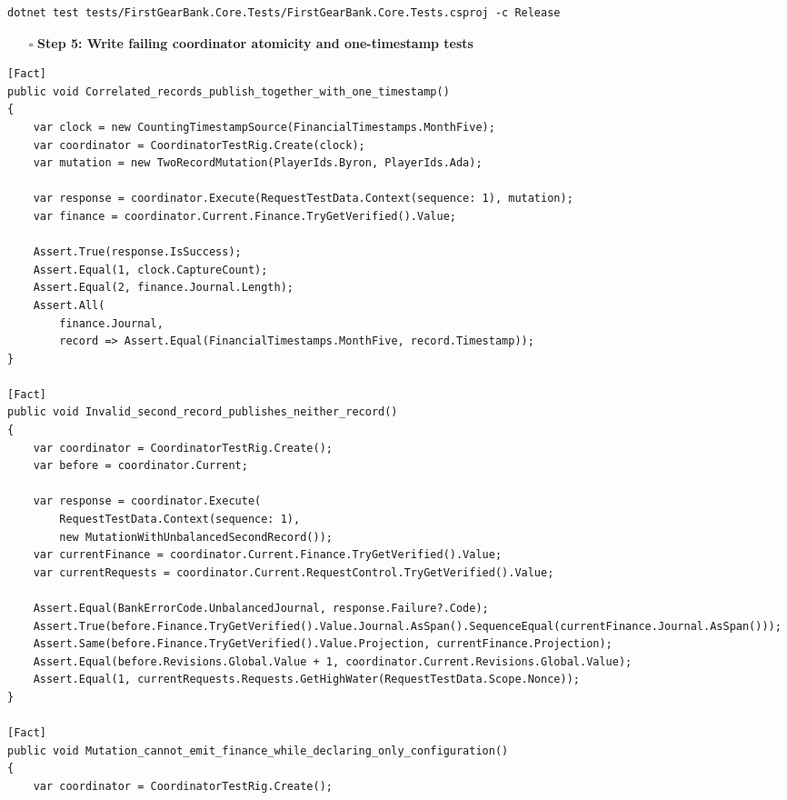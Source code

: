 \documentclass[
  10pt,
  letterpaper,
]{article}
\providecommand{\tightlist}{%
  \setlength{\itemsep}{0pt}\setlength{\parskip}{0pt}}
\begin{document}
\begin{lstlisting}
dotnet test tests/FirstGearBank.Core.Tests/FirstGearBank.Core.Tests.csproj -c Release
\end{lstlisting}

\begin{itemize}
\tightlist
\item[$\square$]
  \textbf{Step 5: Write failing coordinator atomicity and one-timestamp
  tests}
\end{itemize}

\begin{lstlisting}
[Fact]
public void Correlated_records_publish_together_with_one_timestamp()
{
    var clock = new CountingTimestampSource(FinancialTimestamps.MonthFive);
    var coordinator = CoordinatorTestRig.Create(clock);
    var mutation = new TwoRecordMutation(PlayerIds.Byron, PlayerIds.Ada);

    var response = coordinator.Execute(RequestTestData.Context(sequence: 1), mutation);
    var finance = coordinator.Current.Finance.TryGetVerified().Value;

    Assert.True(response.IsSuccess);
    Assert.Equal(1, clock.CaptureCount);
    Assert.Equal(2, finance.Journal.Length);
    Assert.All(
        finance.Journal,
        record => Assert.Equal(FinancialTimestamps.MonthFive, record.Timestamp));
}

[Fact]
public void Invalid_second_record_publishes_neither_record()
{
    var coordinator = CoordinatorTestRig.Create();
    var before = coordinator.Current;

    var response = coordinator.Execute(
        RequestTestData.Context(sequence: 1),
        new MutationWithUnbalancedSecondRecord());
    var currentFinance = coordinator.Current.Finance.TryGetVerified().Value;
    var currentRequests = coordinator.Current.RequestControl.TryGetVerified().Value;

    Assert.Equal(BankErrorCode.UnbalancedJournal, response.Failure?.Code);
    Assert.True(before.Finance.TryGetVerified().Value.Journal.AsSpan().SequenceEqual(currentFinance.Journal.AsSpan()));
    Assert.Same(before.Finance.TryGetVerified().Value.Projection, currentFinance.Projection);
    Assert.Equal(before.Revisions.Global.Value + 1, coordinator.Current.Revisions.Global.Value);
    Assert.Equal(1, currentRequests.Requests.GetHighWater(RequestTestData.Scope.Nonce));
}

[Fact]
public void Mutation_cannot_emit_finance_while_declaring_only_configuration()
{
    var coordinator = CoordinatorTestRig.Create();


\end{lstlisting}
\end{document}
